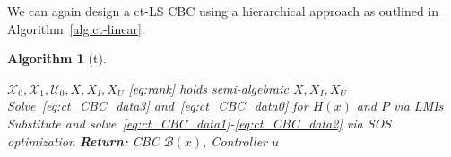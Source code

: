 \documentclass[sigconf]{acmart}
\newtheorem{algorithm}{Algorithm}
\begin{document}

We can again design a ct-LS CBC using a hierarchical approach as outlined in Algorithm~\ref{alg:ct-linear}.

\begin{algorithm}[t]
\caption{Hierarchy for ct-LS CBCs}\label{alg:ct-linear}
\begin{algorithmic}[1]
\Require $\mathcal{X}_0,\mathcal{X}_1,\mathcal{U}_0,X,X_I,X_U$
\Ensure \eqref{eq:rank} holds
\Ensure semi-algebraic $X,X_I,X_U$
\State Solve~\eqref{eq:ct_CBC_data3} and~\eqref{eq:ct_CBC_data0} for $H(x)$ and $P$ via LMIs
\State Substitute and solve~\eqref{eq:ct_CBC_data1}-\eqref{eq:ct_CBC_data2} via SOS optimization
\noindent\Statex\textbf{Return:} CBC $\mathcal{B}(x)$, Controller $u$
\end{algorithmic}
\end{algorithm}


\end{document}
